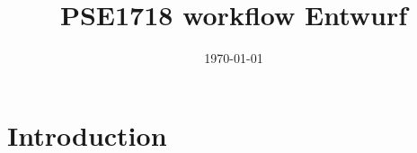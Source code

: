 \documentclass{article}
\title{PSE1718 workflow Entwurf}
\author{}
\date{\today}
\begin{document}
\maketitle

\section{Introduction}
\end{document}
